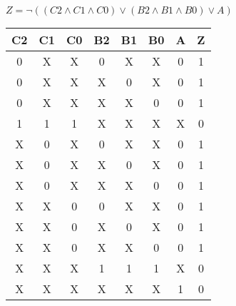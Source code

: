 \begin{center}
    {\(Z = \lnot ((C2 \land C1 \land C0) \lor (B2 \land B1 \land B0) \lor A) \)}
    \begin{table}[h] %
        \begin{center}
            \begin{tabular}{|c|c|c|c|c|c|c||c|} \hline
            C2 & C1 & C0 & B2 & B1 & B0 & A & Z \\ \hline\hline
            0  & X  & X  & 0  & X  & X  & 0 & 1 \\ \hline
            0  & X  & X  & X  & 0  & X  & 0 & 1 \\ \hline
            0  & X  & X  & X  & X  & 0  & 0 & 1 \\ \hline
            1  & 1  & 1  & X  & X  & X  & X & 0 \\ \hline
            X  & 0  & X  & 0  & X  & X  & 0 & 1 \\ \hline
            X  & 0  & X  & X  & 0  & X  & 0 & 1 \\ \hline
            X  & 0  & X  & X  & X  & 0  & 0 & 1 \\ \hline
            X  & X  & 0  & 0  & X  & X  & 0 & 1 \\ \hline
            X  & X  & 0  & X  & 0  & X  & 0 & 1 \\ \hline
            X  & X  & 0  & X  & X  & 0  & 0 & 1 \\ \hline
            X  & X  & X  & 1  & 1  & 1  & X & 0 \\ \hline
            X  & X  & X  & X  & X  & X  & 1 & 0 \\ \hline
            \end{tabular}
        \end{center}
    \end{table}
\end{center}
